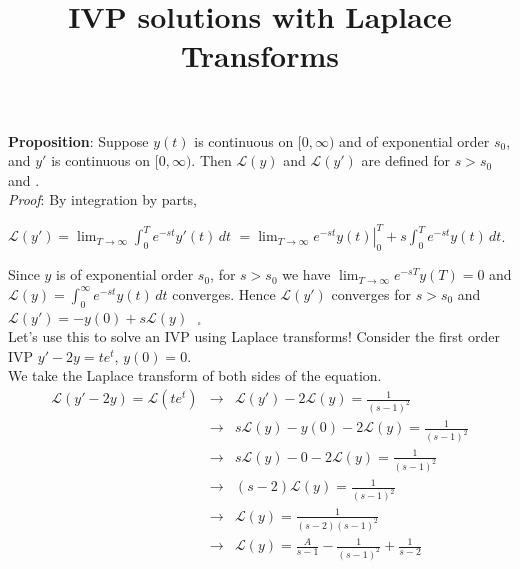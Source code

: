 \documentclass{ximera}
\begin{document}
\begin{abstract}
 \end{abstract}

    \title{IVP solutions with Laplace Transforms}
    
    \maketitle

 \textbf{Proposition}:  Suppose $y(t)$ is continuous on $[0,\infty)$ and of exponential order $s_{0}$, and $y'$ is continuous on $[0,\infty)$.   Then $\mathcal{L}(y)$ and $\mathcal{L}(y')$ are defined for $s>s_{0}$  and .\\


 \emph{Proof}:  By integration by parts,

  $\displaystyle  \mathcal{L}(y')=\lim_{T\rightarrow \infty}\int_{0}^{T}e^{-st}y'(t)\,dt$  $\displaystyle=\lim_{T\rightarrow \infty} \left.e^{-st}y(t)\right|_{0}^{T}+s\int_{0}^{T}e^{-st}y(t)\,dt$.

\medskip

  Since $y$ is of exponential order $s_{0}$, for $s>s_{0}$ we have $\displaystyle \lim_{T\rightarrow \infty}e^{-sT}y(T)=0$  and $\displaystyle \mathcal{L}(y)=\int_{0}^{\infty}e^{-st}y(t)\,dt$ converges.  Hence $\mathcal{L}(y')$ converges for $s>s_{0}$  and $ \mathcal{L}(y')=-y(0)+s\mathcal{L}(y)\mbox{ }_{\square}$\\


 Let's use this to solve an IVP using Laplace transforms!   Consider the first order IVP $y'-2y=te^t$, $y(0)=0$.\\

 We take the Laplace transform of both sides of the equation.  \\

 \begin{eqnarray*}
  \mathcal{L}(y'-2y)=\mathcal{L}(te^t) &\rightarrow &  \mathcal{L}(y')-2\mathcal{L}(y)=\frac{1}{(s-1)^2} \\
 &\rightarrow & s\mathcal{L}(y)-y(0)-2\mathcal{L}(y)=\frac{1}{(s-1)^2} \\
 &\rightarrow & s\mathcal{L}(y)-0-2\mathcal{L}(y)=\frac{1}{(s-1)^2} \\
 &\rightarrow & (s-2)\mathcal{L}(y)=\frac{1}{(s-1)^2} \\
 &\rightarrow & \mathcal{L}(y)=\frac{1}{(s-2)(s-1)^2}\\
 &\rightarrow & \mathcal{L}(y)=\frac{A}{s-1}-\frac{1}{(s-1)^2}+\frac{1}{s-2}
 \end{eqnarray*}
\end{document}
